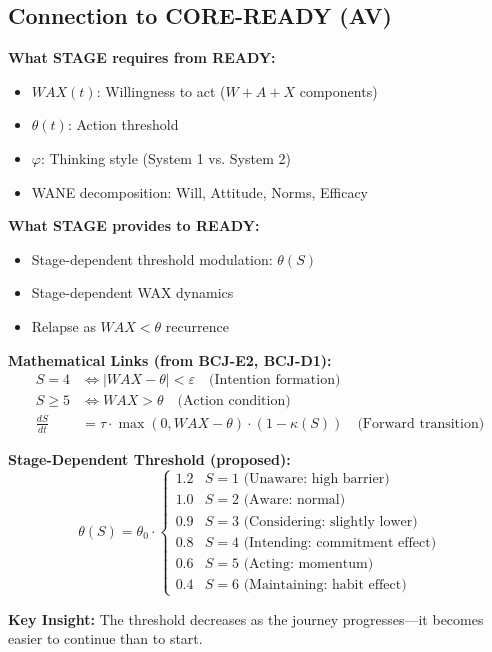 \subsection{Connection to CORE-READY (AV)}

\begin{tcolorbox}[colback=blue!5!white, colframe=blue!75!black,
    title=Integration: STAGE $\leftrightarrow$ READY]
\textbf{What STAGE requires from READY:}
\begin{itemize}[nosep]
\item $WAX(t)$: Willingness to act ($W + A + X$ components)
\item $\theta(t)$: Action threshold
\item $\varphi$: Thinking style (System 1 vs. System 2)
\item WANE decomposition: Will, Attitude, Norms, Efficacy
\end{itemize}

\textbf{What STAGE provides to READY:}
\begin{itemize}[nosep]
\item Stage-dependent threshold modulation: $\theta(S)$
\item Stage-dependent WAX dynamics
\item Relapse as $WAX < \theta$ recurrence
\end{itemize}

\textbf{Mathematical Links (from BCJ-E2, BCJ-D1):}
\begin{align}
S = 4 &\Leftrightarrow |WAX - \theta| < \varepsilon \quad \text{(Intention formation)} \\
S \geq 5 &\Leftrightarrow WAX > \theta \quad \text{(Action condition)} \\
\frac{dS}{dt} &= \tau \cdot \max(0, WAX - \theta) \cdot (1 - \kappa(S)) \quad \text{(Forward transition)}
\end{align}

\textbf{Stage-Dependent Threshold (proposed):}
\begin{equation}
\theta(S) = \theta_0 \cdot \begin{cases}
1.2 & S = 1 \text{ (Unaware: high barrier)} \\
1.0 & S = 2 \text{ (Aware: normal)} \\
0.9 & S = 3 \text{ (Considering: slightly lower)} \\
0.8 & S = 4 \text{ (Intending: commitment effect)} \\
0.6 & S = 5 \text{ (Acting: momentum)} \\
0.4 & S = 6 \text{ (Maintaining: habit effect)}
\end{cases}
\end{equation}

\textbf{Key Insight:} The threshold decreases as the journey progresses—it becomes easier to continue than to start.
\end{tcolorbox}

